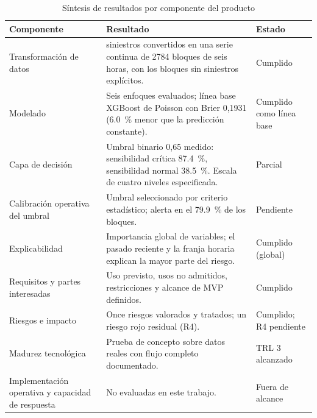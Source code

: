 \begin{table}[htbp]
\centering
\caption{Síntesis de resultados por componente del producto}
\label{tab:res-sintesis}
\begin{tabularx}{\linewidth}{@{}>{\raggedright\arraybackslash}p{3.4cm}>{\raggedright\arraybackslash}X>{\raggedright\arraybackslash}p{2.6cm}@{}}
\toprule
\textbf{Componente} & \textbf{Resultado} & \textbf{Estado} \\
\midrule
Transformación de datos & 4320 siniestros convertidos en una serie continua de 2784 bloques de seis horas, con los bloques sin siniestros explícitos. & Cumplido \\
Modelado & Seis enfoques evaluados; línea base XGBoost de Poisson con Brier 0,1931 (\qty{6.0}{\percent} menor que la predicción constante). & Cumplido como línea base \\
Capa de decisión & Umbral binario 0,65 medido: sensibilidad crítica \qty{87.4}{\percent}, sensibilidad normal \qty{38.5}{\percent}. Escala de cuatro niveles especificada. & Parcial \\
Calibración operativa del umbral & Umbral seleccionado por criterio estadístico; alerta en el \qty{79.9}{\percent} de los bloques. & Pendiente \\
Explicabilidad & Importancia global de variables; el pasado reciente y la franja horaria explican la mayor parte del riesgo. & Cumplido (global) \\
Requisitos y partes interesadas & Uso previsto, usos no admitidos, restricciones y alcance de MVP definidos. & Cumplido \\
Riesgos e impacto & Once riesgos valorados y tratados; un riesgo rojo residual (R4). & Cumplido; R4 pendiente \\
Madurez tecnológica & Prueba de concepto sobre datos reales con flujo completo documentado. & TRL 3 alcanzado \\
Implementación operativa y capacidad de respuesta & No evaluadas en este trabajo. & Fuera de alcance \\
\bottomrule
\end{tabularx}
\end{table}
